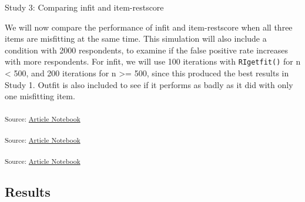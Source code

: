 \documentclass[
  letterpaper,
  DIV=11,
  numbers=noendperiod]{scrartcl}
\begin{document}
Study 3: Comparing infit and item-restscore

We will now compare the performance of infit and item-restscore when all
three items are misfitting at the same time. This simulation will also
include a condition with 2000 respondents, to examine if the false
positive rate increases with more respondents. For infit, we will use
100 iterations with \texttt{RIgetfit()} for n \textless{} 500, and 200
iterations for n \textgreater= 500, since this produced the best results
in Study 1. Outfit is also included to see if it performs as badly as it
did with only one misfitting item.

\textsubscript{Source:
\href{https://pgmj.github.io/rasch_itemfit/index.qmd.html}{Article
Notebook}}

\textsubscript{Source:
\href{https://pgmj.github.io/rasch_itemfit/index.qmd.html}{Article
Notebook}}

\textsubscript{Source:
\href{https://pgmj.github.io/rasch_itemfit/index.qmd.html}{Article
Notebook}}

\subsection{Results}\label{results-2}
\end{document}
